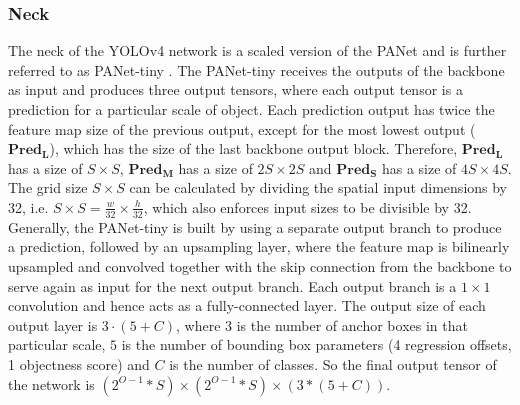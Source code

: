 \subsubsection{Neck}

The neck of the \ac{YOLOv4} network is a scaled version of the \ac{PANet} \cite{pannet} and is further referred to as PANet-tiny \cite{yolov4_tiny}.
The PANet-tiny receives the outputs of the backbone as input and produces three output tensors, where each output tensor is a prediction for a particular scale of object.
Each prediction output has twice the feature map size of the previous output, except for the most lowest output ($\mathbf{Pred_L}$), which has the size of the last backbone output block.
Therefore, $\mathbf{Pred_L}$ has a size of $S \times S$, $\mathbf{Pred_M}$ has a size of $2S \times 2S$ and $\mathbf{Pred_S}$ has a size of $4S \times 4S$.
The grid size $S \times S$ can be calculated by dividing the spatial input dimensions by 32, i.e. $S \times S = \frac{w}{32} \times \frac{h}{32}$, which also enforces input sizes to be divisible by 32.
Generally, the PANet-tiny is built by using a separate output branch to produce a prediction, followed by an upsampling layer, where the feature map is bilinearly upsampled and convolved together with the skip connection from the backbone to serve again as input for the next output branch.
Each output branch is a $1 \times 1$ convolution and hence acts as a fully-connected layer.
The output size of each output layer is $3 \cdot (5+C)$, where $3$ is the number of anchor boxes in that particular scale, $5$ is the number of bounding box parameters (4 regression offsets, 1 objectness score) and $C$ is the number of classes.
So the final output tensor of the network is $(2^{O-1}*S) \times (2^{O-1}*S) \times (3*(5+C))$.


